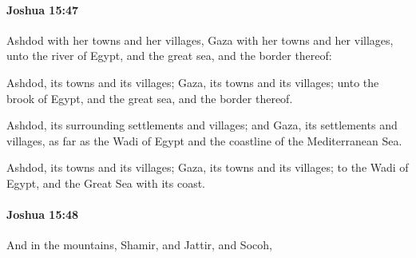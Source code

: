 		\paragraph{Joshua 15:47} %
			\label{JOSHUA-15-47}

			Ashdod with her towns and her villages, Gaza with her towns and her villages, unto the river of Egypt, and the great sea, and the border thereof:

			\begin{versebox}
					\item[BHS] 
					\item[ASV] Ashdod, its towns and its villages; Gaza, its towns and its villages; unto the brook of Egypt, and the great sea, and the border thereof.
					\item[NIV] Ashdod, its surrounding settlements and villages; and Gaza, its settlements and villages, as far as the Wadi of Egypt and the coastline of the Mediterranean Sea.
					\item[NRSV] Ashdod, its towns and its villages; Gaza, its towns and its villages; to the Wadi of Egypt, and the Great Sea with its coast.
			\end{versebox}

		\paragraph{Joshua 15:48} %
			\label{JOSHUA-15-48}

			And in the mountains, Shamir, and Jattir, and Socoh,

